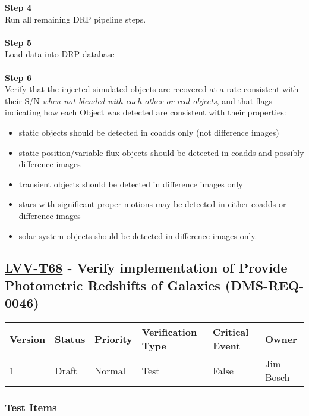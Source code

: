 \textbf{Step 4}\\
Run all remaining DRP pipeline steps.\\
~\\
\textbf{Step 5}\\
Load data into DRP database\\
~\\
\textbf{Step 6}\\
Verify that the injected simulated objects are recovered at a rate
consistent with their S/N \emph{when not blended with each other or real
objects}, and that flags indicating how each Object was detected are
consistent with their properties:

\begin{itemize}
\tightlist
\item
  static objects should be detected in coadds only (not difference
  images)
\item
  static-position/variable-flux objects should be detected in coadds and
  possibly difference images
\item
  transient objects should be detected in difference images only
\item
  stars with significant proper motions may be detected in either coadds
  or difference images
\item
  solar system objects should be detected in difference images only.
\end{itemize}

\hypertarget{lvv-t68---verify-implementation-of-provide-photometric-redshifts-of-galaxies-dms-req-0046}{%
\subsection{\texorpdfstring{\href{https://jira.lsstcorp.org/secure/Tests.jspa\#/testCase/LVV-T68}{LVV-T68}
- Verify implementation of Provide Photometric Redshifts of Galaxies
(DMS-REQ-0046)}{LVV-T68 - Verify implementation of Provide Photometric Redshifts of Galaxies (DMS-REQ-0046)}}\label{lvv-t68---verify-implementation-of-provide-photometric-redshifts-of-galaxies-dms-req-0046}}

\begin{longtable}[]{@{}llllll@{}}
\toprule
Version & Status & Priority & Verification Type & Critical Event &
Owner\tabularnewline
\midrule
\endhead
1 & Draft & Normal & Test & False & Jim Bosch\tabularnewline
\bottomrule
\end{longtable}

\hypertarget{test-items-44}{%
\subsubsection{Test Items}\label{test-items-44}}

